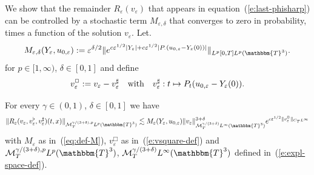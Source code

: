 We show that the remainder $R_{\varepsilon} (v_{\varepsilon})$ that appears in
equation~(\ref{e:last-phisharp}) can be controlled by a stochastic term
$M_{\varepsilon, \delta}$ that converges to zero in probability, times a
function of the solution $v_{\varepsilon}$. Let.
\begin{equation}
  M_{\varepsilon, \delta} (Y_{\varepsilon}, u_{0, \varepsilon}) \assign
  \varepsilon^{\delta / 2} \|e^{c \varepsilon^{1 / 2}  | Y_{\varepsilon} | + c
  \varepsilon^{1 / 2} | P_{\cdot}  (u_{0, \varepsilon} - Y_{\varepsilon} (0))
  |} \|_{L^p [0, T] L^p (\mathbbm{T}^3)} . \label{eq:def-M}
\end{equation}
for $p \in [1, \infty)$, $\delta \in [0, 1]$ and define
\begin{equation}
  v_{\varepsilon}^{\Box} := v_{\varepsilon} - v^{\sharp}_{\varepsilon}
  \quad \text{with} \quad v^{\sharp}_{\varepsilon} : t \mapsto P_t (u_{0,
  \varepsilon} - Y_{\varepsilon} (0)) . \label{e:vsquare-def}
\end{equation}


\begin{lemma}
  \label{l:rem-estim} For every $\gamma \in (0, 1)$, $\delta \in [0, 1]$ we
  have
  \[ \|R_{\varepsilon} (v_{\varepsilon}, v^{\flat}_{\varepsilon},
     v^{\sharp}_{\varepsilon}) (t, x) \|_{\mathcal{M}^{\gamma / (3 + \delta),
     p}_T L^p (\mathbbm{T}^3)} \lesssim M_{\varepsilon} (Y_{\varepsilon},
     u_{0, \varepsilon}) \| v_{\varepsilon} \|^{3 +
     \delta}_{\mathcal{M}_T^{\gamma / (3 + \delta)} L^{\infty}
     (\mathbbm{T}^3)} e^{c \varepsilon^{1 / 2} \|v^{\Box}_{\varepsilon}
     \|_{C_T L^{\infty}}} \]
  with $M_{\varepsilon}$ as in~(\ref{eq:def-M}), $v^{\Box}_{\varepsilon}$ as
  in~(\ref{e:vsquare-def}) and $\mathcal{M}^{\gamma / (3 + \delta), p}_T L^p
  (\mathbbm{T}^3)$, $\mathcal{M}_T^{\gamma / (3 + \delta)} L^{\infty}
  (\mathbbm{T}^3)$ defined in~(\ref{e:expl-space-def}).
\end{lemma}

